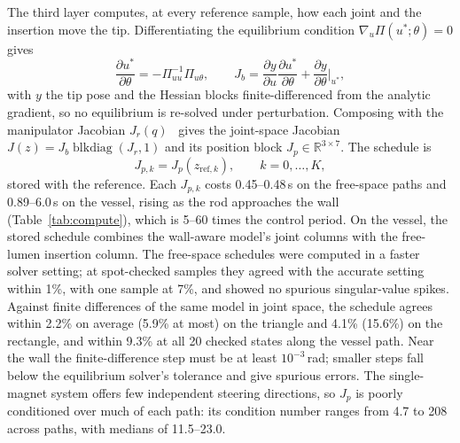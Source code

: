 \documentclass[journal]{IEEEtran}
\begin{document}
The third layer computes, at every reference sample, how each joint and the
insertion move the tip. Differentiating the equilibrium condition
$\nabla_u\Pi(u^*;\theta)=0$ gives
\begin{equation}
\frac{\partial u^*}{\partial\theta}=-\Pi_{uu}^{-1}\Pi_{u\theta},\qquad
J_b=\frac{\partial y}{\partial u}\frac{\partial u^*}{\partial\theta}
+\frac{\partial y}{\partial\theta}\Big|_{u^*},
\label{eq:ift}
\end{equation}
with $y$ the tip pose and the Hessian blocks finite-differenced from the
analytic gradient, so no equilibrium is re-solved under perturbation.
Composing with the manipulator Jacobian $J_r(q)$~\cite{lynchpark2017modern}
gives the joint-space Jacobian $J(z)=J_b\operatorname{blkdiag}(J_r,1)$ and its
position block $J_p\in\mathbb R^{3\times7}$. The schedule is
\begin{equation}
J_{p,k}=J_p(z_{\mathrm{ref},k}),\qquad k=0,\dots,K,
\label{eq:schedule}
\end{equation}
stored with the reference. Each $J_{p,k}$ costs 0.45--0.48\,s on the
free-space paths and 0.89--6.0\,s on the vessel, rising as the rod
approaches the wall (Table~\ref{tab:compute}), which is 5--60 times the
control period. On the vessel, the stored schedule combines the
wall-aware model's joint columns with the free-lumen insertion column.
The free-space schedules were computed in a faster solver setting; at
spot-checked samples they agreed with the accurate setting within 1\%,
with one sample at 7\%, and showed no spurious singular-value spikes.
Against finite differences of the same model in joint space, the
schedule agrees within 2.2\% on average (5.9\% at most) on the triangle
and 4.1\% (15.6\%) on the rectangle, and within 9.3\% at all 20 checked
states along the vessel path. Near the wall the finite-difference step must
be at least $10^{-3}$\,rad; smaller steps fall below the equilibrium
solver's tolerance and give spurious errors.
The single-magnet system offers few independent steering directions, so
$J_p$ is poorly conditioned over much of each path: its condition number
ranges from 4.7 to 208 across paths, with medians of 11.5--23.0.
\end{document}
